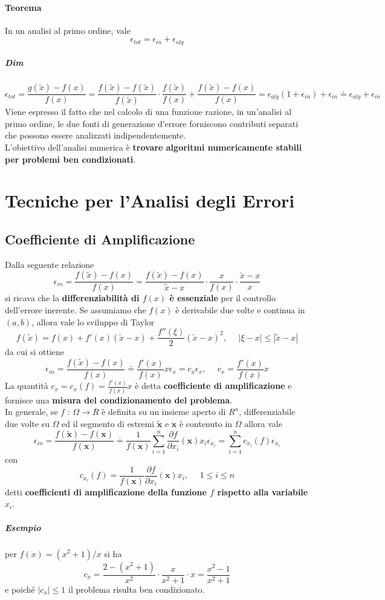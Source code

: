 \documentclass[10pt]{book}
\begin{document}
\paragraph{Teorema} In un analisi al primo ordine, vale $$\epsilon_{tot} = \epsilon_{in} + \epsilon_{alg}$$
\subparagraph{Dim} $$\epsilon_{tot} = \frac{g(\tilde{x}) - f(x)}{f(x)} = \frac{f(\tilde{x}) - f(\tilde{x})}{f(\tilde{x})}\cdot\frac{f(\tilde{x})}{f(x)} + \frac{f(\tilde{x}) - f(x)}{f(x)} = \epsilon_{alg}(1 + \epsilon_{in}) + \epsilon_{in} \doteq \epsilon_{alg} + \epsilon_{in}$$
Viene espresso il fatto che nel calcolo di una funzione razione, in un'analisi al primo ordine, le due fonti di generazione d'errore forniscono contributi separati che possono essere analizzati indipendentemente.\\
L'obiettivo dell'analisi numerica è \textbf{trovare algoritmi numericamente stabili per problemi ben condizionati}.
\section{Tecniche per l'Analisi degli Errori}
\subsection{Coefficiente di Amplificazione}
Dalla seguente relazione $$\epsilon_{in} = \frac{f(\tilde{x}) - f(x)}{f(x)} = \frac{f(\tilde{x}) - f(x)}{\tilde{x} - x}\cdot\frac{x}{f(x)}\cdot\frac{\tilde{x} - x}{x}$$ si ricava che la \textbf{differenziabilità di $f(x)$ è essenziale} per il controllo dell'errore inerente. Se assumiamo che $f(x)$ è derivabile due volte e continua in $(a, b)$, allora vale lo sviluppo di Taylor $$f(\tilde{x}) = f(x) + f'(x)(\tilde{x} - x) + \frac{f''(\xi)}{2}(\tilde{x} - x)^2,\:\:\:\:\:\:|\xi - x| \leq |\tilde{x} - x| $$ da cui si ottiene $$ \epsilon_{in} = \frac{f(\tilde{x}) - f(x)}{f(x)} \doteq \frac{f'(x)}{f(x)}x\epsilon_x = c_x\epsilon_x,\:\:\:\:\:\:c_x = \frac{f'(x)}{f(x)}x $$
La quantità $c_x = c_x(f) = \frac{f'(x)}{f(x)}x$ è detta \textbf{coefficiente di amplificazione} e fornisce una \textbf{misura del condizionamento del problema}.\\
In generale, se $f$ : $\Omega \rightarrow R$ è definita su un insieme aperto di $R^n$, differenziabile due volte su $\Omega$ ed il segmento di estremi $\tilde{\textbf{x}}$ e $\textbf{x}$ è contenuto in $\Omega$ allora vale
$$ \epsilon_{in} = \frac{f(\tilde{\textbf{x}}) - f(\textbf{x})}{f(\textbf{x})} \doteq \frac{1}{f(\textbf{x})}\sum_{i=1}^n \frac{\partial f}{\partial x_i}(\textbf{x})x_i\epsilon_{x_i} = \sum_{i=1}^n c_{x_i}(f)\epsilon_{x_i}$$
con $$c_{x_i}(f) = \frac{1}{f(\textbf{x})}\frac{\partial f}{\partial x_i}(\textbf{x})x_i,\:\:\:\:\:\:1 \leq i \leq n$$
detti \textbf{coefficienti di amplificazione della funzione $f$ rispetto alla variabile $x_i$}.
\subparagraph{Esempio} per $f(x) = (x^2 + 1)/x$ si ha $$c_x = \frac{2 - (x^2 + 1)}{x^2}\cdot \frac{x}{x^2 + 1}\cdot x = \frac{x^2 - 1}{x^2 + 1}$$ e poiché $|c_x| \leq 1$ il problema risulta ben condizionato.
\end{document}
